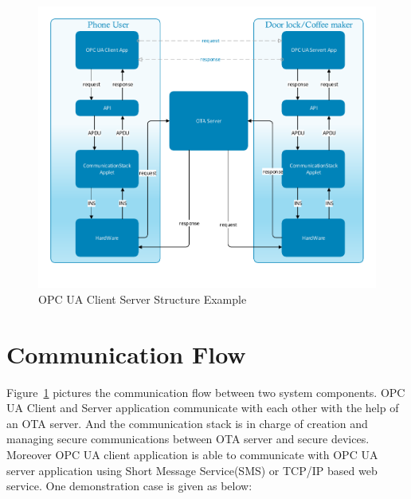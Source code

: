  \begin{figure}[!htb]
	\centering
	\includegraphics[width=1.1\textwidth]{csoverview}
		\caption{OPC UA Client Server Structure Example}
	\label{fig:softwareStructure}
\end{figure}

\section{Communication Flow}
Figure~\ref{fig:softwareStructure} pictures the communication flow between two system components. OPC UA Client and Server application communicate with each other with the help of an OTA server. And the communication stack is in charge of creation and managing secure communications between OTA server and secure devices. Moreover OPC UA client application is able to communicate with OPC UA server application using Short Message Service(SMS) or TCP/IP based web service. One demonstration case is given as below:

